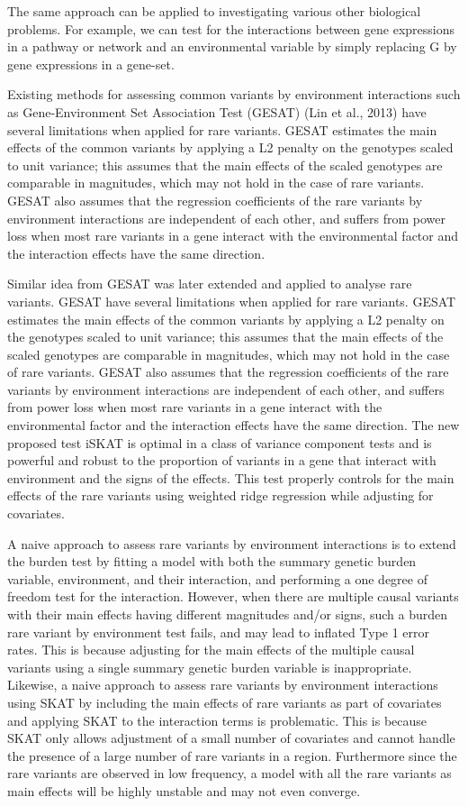 \documentclass[
]{book}
\begin{document}
The same approach can be applied to investigating various other biological problems. For example, we can test for the interactions between gene expressions in a pathway or network and an environmental variable by simply replacing G by gene expressions in a gene-set.

Existing methods for assessing common variants by environment interactions such as Gene-Environment Set Association Test (GESAT) (Lin et al., 2013) have several limitations when applied for rare variants. GESAT estimates the main effects of the common variants by applying a L2 penalty on the genotypes scaled to unit variance; this assumes that the main effects of the scaled genotypes are comparable in magnitudes, which may not hold in the case of rare variants. GESAT also assumes that the regression coefficients of the rare variants by environment interactions are independent of each other, and suffers from power loss when most rare variants in a gene interact with the environmental factor and the interaction effects have the same direction.

Similar idea from GESAT was later extended and applied to analyse rare variants. GESAT have several limitations when applied for rare variants. GESAT estimates the main effects of the common variants by applying a L2 penalty on the genotypes scaled to unit variance; this assumes that the main effects of the scaled genotypes are comparable in magnitudes, which may not hold in the case of rare variants. GESAT also assumes that the regression coefficients of the rare variants by environment interactions are independent of each other, and suffers from power loss when most rare variants in a gene interact with the environmental factor and the interaction effects have the same direction. The new proposed test iSKAT is optimal in a class of variance component tests and is powerful and robust to the proportion of variants in a gene that interact with environment and the signs of the effects. This test properly controls for the main effects of the rare variants using weighted ridge regression while adjusting for covariates.

A naive approach to assess rare variants by environment interactions is to extend the burden test by fitting a model with both the summary genetic burden variable, environment, and their interaction, and performing a one degree of freedom test for the interaction. However, when there are multiple causal variants with their main effects having different magnitudes and/or signs, such a burden rare variant by environment test fails, and may lead to inflated Type 1 error rates. This is because adjusting for the main effects of the multiple causal variants using a single summary genetic burden variable is inappropriate. Likewise, a naive approach to assess rare variants by environment interactions using SKAT by including the main effects of rare variants as part of covariates and applying SKAT to the interaction terms is problematic. This is because SKAT only allows adjustment of a small number of covariates and cannot handle the presence of a large number of rare variants in a region. Furthermore since the rare variants are observed in low frequency, a model with all the rare variants as main effects will be highly unstable and may not even converge.
\end{document}
